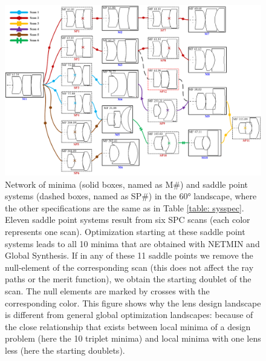 \begin{figure}[h!]
    \centering
    \includegraphics[scale=0.41]{chapter-3/figures/TripletNetwork.png}
    \caption{Network of minima (solid boxes, named as M\#) and saddle point systems (dashed boxes, named as SP\#) in the 60° landscape, where the other specifications are the same as in Table \ref{table: sysspec}. Eleven saddle point systems result from six SPC scans (each color represents one scan). Optimization starting at these saddle point systems leads to all 10 minima that are obtained with NETMIN and Global Synthesis. If in any of these 11 saddle points we remove the null-element of the corresponding scan (this does not affect the ray paths or the merit function), we obtain the starting doublet of the scan. The null elements are marked by crosses with the corresponding color. This figure shows why the lens design landscape is different from general global optimization landscapes: because of the close relationship that exists between local minima of a design problem (here the 10 triplet minima) and local minima with one lens less (here the starting doublets).}\label{fig:tripletnetwork}
\end{figure}

